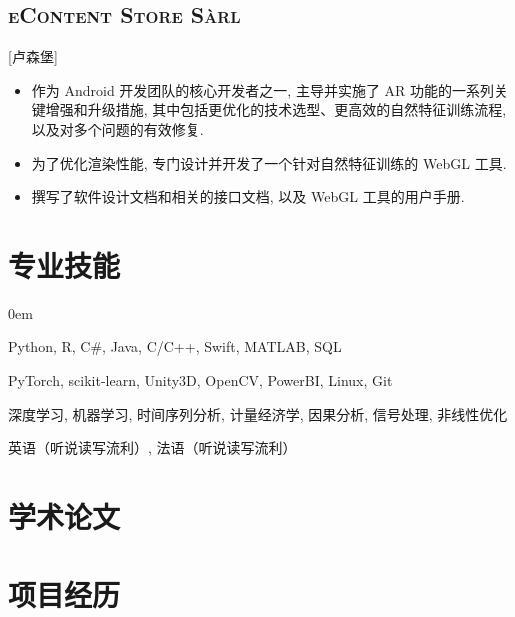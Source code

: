 \documentclass{mycv}
\begin{document}
\vspace{-\parskip}

\subsection{\large \scshape eContent Store S\`arl}[卢森堡]

\begin{positions}
\end{positions}

\begin{itemize}
  \itemsep 0em
  \item 作为 Android 开发团队的核心开发者之一, 主导并实施了 AR 功能的一系列关键增强和升级措施, 其中包括更优化的技术选型、更高效的自然特征训练流程, 以及对多个问题的有效修复.
  \item 为了优化渲染性能, 专门设计并开发了一个针对自然特征训练的 WebGL 工具.
  \item 撰写了软件设计文档和相关的接口文档, 以及 WebGL 工具的用户手册.
\end{itemize}

\section{专业技能}

\begin{description}
  \itemsep 0em
  \item[{\it 编程语言}:] Python, R, C\#, Java, C/C++, Swift, MATLAB, SQL
  \item[{\it 工具与框架}:] PyTorch, scikit-learn, Unity3D, OpenCV, PowerBI, Linux, Git
  \item[{\it 技能专长}:] 深度学习, 机器学习, 时间序列分析, 计量经济学, 因果分析, 信号处理, 非线性优化
  \item[{\it 外语}:] 英语（听说读写流利）, 法语（听说读写流利）
\end{description}

\section{学术论文}

\vspace{-0.5em}
\section{项目经历}
\end{document}
